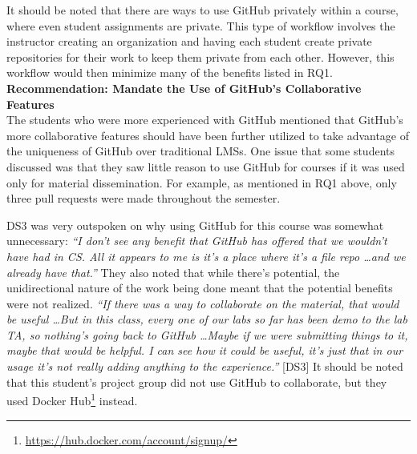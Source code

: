 It should be noted that there are ways to use GitHub privately within a course, where even student assignments are private. This type of workflow involves the instructor creating an organization and having each student create private repositories for their work to keep them private from each other. However, this workflow would then minimize many of the benefits listed in RQ1. \\


\textbf{Recommendation: Mandate the Use of GitHub's Collaborative Features} \\
The students who were more experienced with GitHub mentioned that GitHub's more collaborative features should have been further utilized to take advantage of the uniqueness of GitHub over traditional LMSs. One issue that some students discussed was that they saw little reason to use GitHub for courses if it was used only for material dissemination. For example, as mentioned in RQ1 above, only three pull requests were made throughout the semester.

DS3 was very outspoken on why using GitHub for this course was somewhat unnecessary: \textit{``I don't see any benefit that GitHub has offered that we wouldn't have had in CS. All it appears to me is it's a place where it's a file repo \ldots and we already have that.''} They also noted that while there's potential, the unidirectional nature of the work being done meant that the potential benefits were not realized. \textit{``If there was a way to collaborate on the material, that would be useful \ldots But in this class, every one of our labs so far has been demo to the lab TA, so nothing's going back to GitHub \ldots Maybe if we were submitting things to it, maybe that would be helpful. I can see how it could be useful, it's just that in our usage it's not really adding anything to the experience.''} [DS3] It should be noted that this student's project group did not use GitHub to collaborate, but they used Docker Hub\footnote{\url{https://hub.docker.com/account/signup/}} instead.


